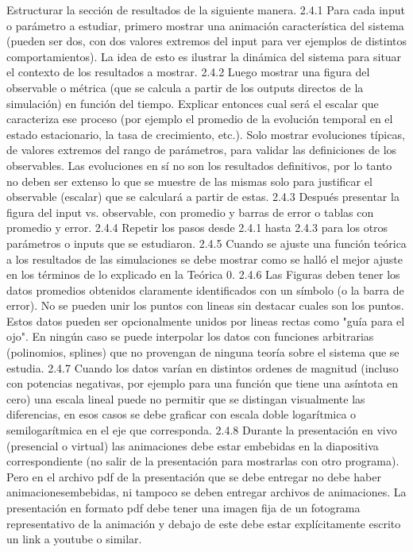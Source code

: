 \documentclass[11pt]{article}
\begin{document}
    Estructurar la sección de resultados de la siguiente manera.
    2.4.1 Para cada input o parámetro a estudiar, primero mostrar una animación característica del
    sistema (pueden ser dos, con dos valores extremos del input para ver ejemplos de distintos
    comportamientos). La idea de esto es ilustrar la dinámica del sistema para situar el contexto de los
    resultados a mostrar.
    2.4.2 Luego mostrar una figura del observable o métrica (que se calcula a partir de los outputs
    directos de la simulación) en función del tiempo. Explicar entonces cual será el escalar que
    caracteriza ese proceso (por ejemplo el promedio de la evolución temporal en el estado
    estacionario, la tasa de crecimiento, etc.). Solo mostrar evoluciones típicas, de valores extremos
    del rango de parámetros, para validar las definiciones de los observables. Las evoluciones en sí
    no son los resultados definitivos, por lo tanto no deben ser extenso lo que se muestre de las
    mismas solo para justificar el observable (escalar) que se calculará a partir de estas.
    2.4.3 Después presentar la figura del input vs. observable, con promedio y barras de error o tablas
    con promedio y error.
    2.4.4 Repetir los pasos desde 2.4.1 hasta 2.4.3 para los otros parámetros o inputs que se
    estudiaron.
    2.4.5 Cuando se ajuste una función teórica a los resultados de las simulaciones se debe mostrar
    como se halló el mejor ajuste en los términos de lo explicado en la Teórica 0.
    2.4.6 Las Figuras deben tener los datos promedios obtenidos claramente identificados con un
    símbolo (o la barra de error). No se pueden unir los puntos con lineas sin destacar cuales son los
    puntos. Estos datos pueden ser opcionalmente unidos por lineas rectas como "guía para el ojo".
    En ningún caso se puede interpolar los datos con funciones arbitrarias (polinomios, splines) que
    no provengan de ninguna teoría sobre el sistema que se estudia.
    2.4.7 Cuando los datos varían en distintos ordenes de magnitud (incluso con potencias negativas,
    por ejemplo para una función que tiene una asíntota en cero) una escala lineal puede no permitir
    que se distingan visualmente las diferencias, en esos casos se debe graficar con escala doble
    logarítmica o semilogarítmica en el eje que corresponda.
    2.4.8 Durante la presentación en vivo (presencial o virtual) las animaciones debe estar embebidas
    en la diapositiva correspondiente (no salir de la presentación para mostrarlas con otro programa).
    Pero en el archivo pdf de la presentación que se debe entregar no debe haber animacionesembebidas, ni tampoco se deben entregar archivos de animaciones. La presentación en formato
    pdf debe tener una imagen fija de un fotograma representativo de la animación y debajo de este
    debe estar explícitamente escrito un link a youtube o similar.
\end{document}
